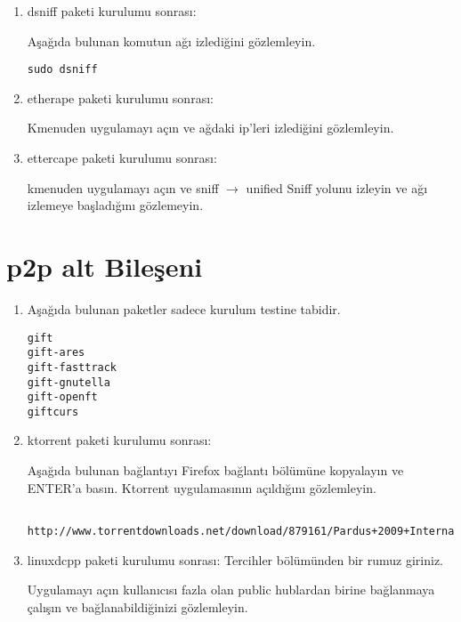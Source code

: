 \documentclass[a4paper,10pt]{article}
\begin{document}
\begin{enumerate}
 \item dsniff paketi kurulumu sonrası:

Aşağıda bulunan komutun ağı izlediğini gözlemleyin.
\begin{verbatim}
sudo dsniff
\end{verbatim}

\item etherape paketi kurulumu sonrası:

Kmenuden uygulamayı açın ve ağdaki ip'leri izlediğini gözlemleyin.

\item ettercape paketi kurulumu sonrası:

kmenuden uygulamayı açın ve sniff $\rightarrow$ unified Sniff yolunu izleyin ve ağı izlemeye başladığını gözlemeyin.
\end{enumerate}

\section{p2p alt Bileşeni}
\begin{enumerate}
 \item Aşağıda bulunan paketler sadece kurulum testine tabidir.

\begin{verbatim}
gift
gift-ares
gift-fasttrack
gift-gnutella
gift-openft
giftcurs
\end{verbatim}

\item ktorrent paketi kurulumu sonrası:

Aşağıda bulunan bağlantıyı Firefox bağlantı bölümüne kopyalayın ve ENTER'a basın. Ktorrent uygulamasının açıldığını gözlemleyin.
\begin{verbatim}
 http://www.torrentdownloads.net/download/879161/Pardus+2009+International+iso
\end{verbatim}

 \item linuxdcpp paketi kurulumu sonrası:
Tercihler bölümünden bir rumuz giriniz. 

Uygulamayı açın kullanıcısı fazla olan public hublardan birine bağlanmaya çalışın ve bağlanabildiğinizi gözlemleyin.
\end{enumerate}
\end{document}
